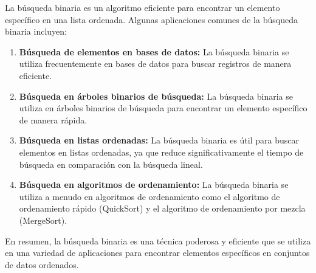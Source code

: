 La búsqueda binaria es un algoritmo eficiente para encontrar un elemento específico en una lista ordenada. Algunas aplicaciones comunes de la búsqueda binaria incluyen:

\begin{enumerate}
	\item \textbf{Búsqueda de elementos en bases de datos:} La búsqueda binaria se utiliza frecuentemente en bases de datos para buscar registros de manera eficiente.

\item \textbf{Búsqueda en árboles binarios de búsqueda:} La búsqueda binaria se utiliza en árboles binarios de búsqueda para encontrar un elemento específico de manera rápida.

\item \textbf{Búsqueda en listas ordenadas:} La búsqueda binaria es útil para buscar elementos en listas ordenadas, ya que reduce significativamente el tiempo de búsqueda en comparación con la búsqueda lineal.

\item \textbf{Búsqueda en algoritmos de ordenamiento:} La búsqueda binaria se utiliza a menudo en algoritmos de ordenamiento como el algoritmo de ordenamiento rápido (QuickSort) y el algoritmo de ordenamiento por mezcla (MergeSort).

\end{enumerate}

En resumen, la búsqueda binaria es una técnica poderosa y eficiente que se utiliza en una variedad de aplicaciones para encontrar elementos específicos en conjuntos de datos ordenados.

